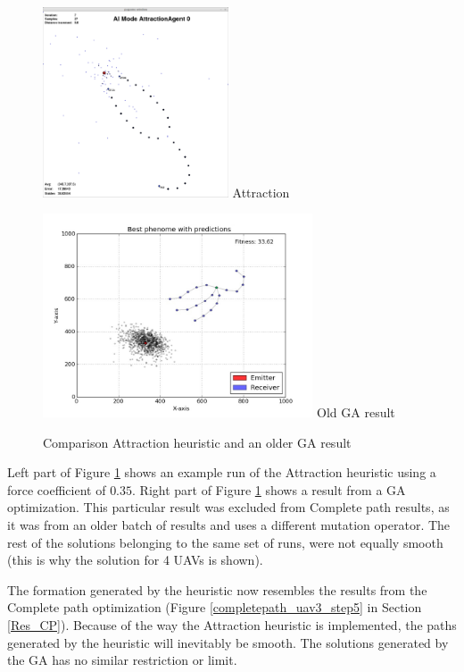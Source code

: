 \documentclass[10pt,a4paper]{book}
\begin{document}
\begin{figure}[H]
\centering
\begin{minipage}{55mm}
  \centering
  \includegraphics[width=55mm]{./heuristicexamples/attraction_optimized.png}
  Attraction
\end{minipage}%
\begin{minipage}{80mm}
  \centering
  \includegraphics[width=80mm]{./heuristicexamples/uav4steps5.jpg}
  Old \gls{GA} result
\end{minipage}
\caption{Comparison Attraction heuristic and an older \gls{GA} result}
\label{FIG_ATTRACTION_OPTIMIZED}
\end{figure}




Left part of Figure \ref{FIG_ATTRACTION_OPTIMIZED} shows an example run of the Attraction heuristic using a force coefficient of $0.35$. Right part of Figure \ref{FIG_ATTRACTION_OPTIMIZED} shows a result from a \gls{GA} optimization. This particular result was excluded from Complete path results, as it was from an older batch of results and uses a different mutation operator. The rest of the solutions belonging to the same set of runs, were not equally smooth (this is why the solution for 4 \glspl{UAV} is shown). 

The formation generated by the heuristic now resembles the results from the Complete path optimization (Figure \ref{completepath_uav3_step5} in Section \ref{Res_CP}). Because of the way the Attraction heuristic is implemented, the paths generated by the heuristic will inevitably be smooth. The solutions generated by the \gls{GA} has no similar restriction or limit.
\end{document}
